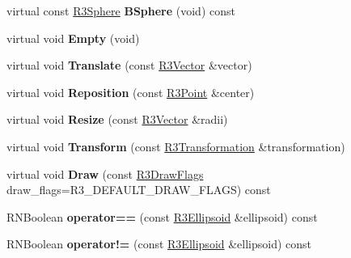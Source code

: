 \begin{DoxyCompactItemize}
\item 
virtual const \hyperlink{class_r3_sphere}{R3\+Sphere} {\bfseries B\+Sphere} (void) const \hypertarget{class_r3_ellipsoid_aa057f5eddb314f8d2b984197b321ce79}{}\label{class_r3_ellipsoid_aa057f5eddb314f8d2b984197b321ce79}

\item 
virtual void {\bfseries Empty} (void)\hypertarget{class_r3_ellipsoid_af935e5f553b8497248d2cab2003adc65}{}\label{class_r3_ellipsoid_af935e5f553b8497248d2cab2003adc65}

\item 
virtual void {\bfseries Translate} (const \hyperlink{class_r3_vector}{R3\+Vector} \&vector)\hypertarget{class_r3_ellipsoid_a17c49774d7dd5412c21a8a332ec65c3a}{}\label{class_r3_ellipsoid_a17c49774d7dd5412c21a8a332ec65c3a}

\item 
virtual void {\bfseries Reposition} (const \hyperlink{class_r3_point}{R3\+Point} \&center)\hypertarget{class_r3_ellipsoid_a5ee1cf7baf9453f24c92f87bfc576e69}{}\label{class_r3_ellipsoid_a5ee1cf7baf9453f24c92f87bfc576e69}

\item 
virtual void {\bfseries Resize} (const \hyperlink{class_r3_vector}{R3\+Vector} \&radii)\hypertarget{class_r3_ellipsoid_a92f5f138077637b9fa5552c8c0ae76a4}{}\label{class_r3_ellipsoid_a92f5f138077637b9fa5552c8c0ae76a4}

\item 
virtual void {\bfseries Transform} (const \hyperlink{class_r3_transformation}{R3\+Transformation} \&transformation)\hypertarget{class_r3_ellipsoid_ad05892338bcb2b7c032d9aa8ab9ea89a}{}\label{class_r3_ellipsoid_ad05892338bcb2b7c032d9aa8ab9ea89a}

\item 
virtual void {\bfseries Draw} (const \hyperlink{class_r_n_flags}{R3\+Draw\+Flags} draw\+\_\+flags=R3\+\_\+\+D\+E\+F\+A\+U\+L\+T\+\_\+\+D\+R\+A\+W\+\_\+\+F\+L\+A\+GS) const \hypertarget{class_r3_ellipsoid_a8ba33ceec3fcfc4147190daff77e9c26}{}\label{class_r3_ellipsoid_a8ba33ceec3fcfc4147190daff77e9c26}

\item 
R\+N\+Boolean {\bfseries operator==} (const \hyperlink{class_r3_ellipsoid}{R3\+Ellipsoid} \&ellipsoid) const \hypertarget{class_r3_ellipsoid_a5f1a75a4f115295cae03cd4ae8db314b}{}\label{class_r3_ellipsoid_a5f1a75a4f115295cae03cd4ae8db314b}

\item 
R\+N\+Boolean {\bfseries operator!=} (const \hyperlink{class_r3_ellipsoid}{R3\+Ellipsoid} \&ellipsoid) const \hypertarget{class_r3_ellipsoid_a9c250b4b6ea88ff48b5b2eb9eb213c02}{}\label{class_r3_ellipsoid_a9c250b4b6ea88ff48b5b2eb9eb213c02}


\end{DoxyCompactItemize}
